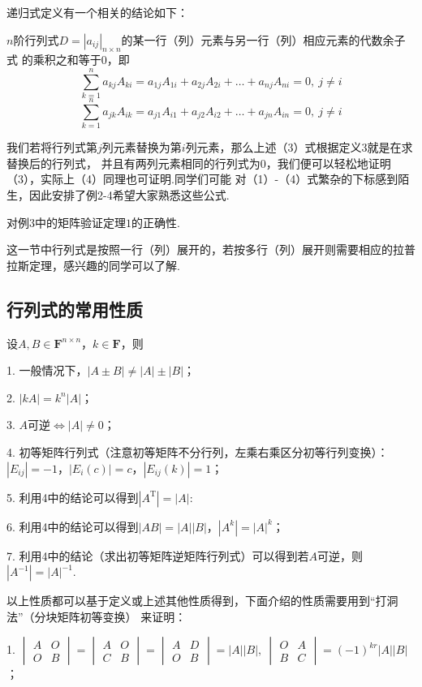 递归式定义有一个相关的结论如下：
\begin{theorem}
	$n$阶行列式$D=|a_{ij}|_{n \times n}$的某一行（列）元素与另一行（列）相应元素的代数余子式
	的乘积之和等于$0$，即
	\begin{equation}
		\sum_{k=1}^{n}a_{kj}A_{ki}=a_{1j}A_{1i}+a_{2j}A_{2i}+\dots+a_{nj}A_{ni}=0,\ j \neq i
	\end{equation}
	\begin{equation}
		\sum_{k=1}^{n}a_{jk}A_{ik}=a_{j1}A_{i1}+a_{j2}A_{i2}+\dots+a_{jn}A_{in}=0,\ j \neq i
	\end{equation}
\end{theorem}
我们若将行列式第$j$列元素替换为第$i$列元素，那么上述（3）式根据定义3就是在求替换后的行列式，
并且有两列元素相同的行列式为0，我们便可以轻松地证明（3），实际上（4）同理也可证明.同学们可能
对（1）-（4）式繁杂的下标感到陌生，因此安排了例2-4希望大家熟悉这些公式.
\begin{example}
	对例$3$中的矩阵验证定理$1$的正确性.
\end{example}
这一节中行列式是按照一行（列）展开的，若按多行（列）展开则需要相应的拉普拉斯定理，感兴趣的同学可以了解.
\subsection{行列式的常用性质}
设$A,B \in \mathbf{F}^{n \times n}$，$k \in \mathbf{F}$，则

1. 一般情况下，$|A \pm B| \neq |A|\pm|B|$；

2. $|kA|=k^n|A|$；

3. $A$可逆$\iff |A| \neq 0$；

4. 初等矩阵行列式（注意初等矩阵不分行列，左乘右乘区分初等行列变换）：$|E_{ij}|=-1$，$|E_i(c)|=c$，$|E_{ij}(k)|=1$；

5. 利用4中的结论可以得到$|A^\mathrm{T}|=|A|$:

6. 利用4中的结论可以得到$|AB|=|A||B|$，$|A^k|=|A|^k$；

7. 利用4中的结论（求出初等矩阵逆矩阵行列式）可以得到若$A$可逆，则$|A^{-1}|=|A|^{-1}$.

以上性质都可以基于定义或上述其他性质得到，下面介绍的性质需要用到“打洞法”（分块矩阵初等变换）
来证明：

1. $\begin{vmatrix}
	A & O \\ O & B
\end{vmatrix} = \begin{vmatrix}
	A & O \\ C & B
\end{vmatrix} = \begin{vmatrix}
	A & D \\ O & B
\end{vmatrix} = |A||B|,\ \begin{vmatrix}
	O & A \\ B & C
\end{vmatrix} = (-1)^{kr}|A||B|$；

